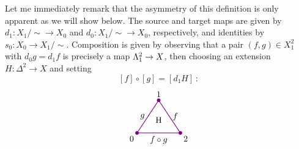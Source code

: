         Let me immediately remark that the asymmetry of this definition is only apparent as we will show below. The source and target maps are given by $d_1 \colon {X_1}/{\sim} \to X_0$ and $d_0 \colon {X_1}/{\sim} \to X_0$, respectively, and identities by $s_0 \colon X_0 \to {X_1}/{\sim}$. Composition is given by observing that a pair $(f, g) \in X^2_1$ with $d_0g = d_1f$ is precisely a map $\Lambda^{2}_{1} \to X$, then choosing an extension $H \colon \Delta^2 \to X$ and setting
        \begin{equation*}
            \left[f\right] \circ \left[g\right] = \left[d_1 H\right] \,\colon
        \end{equation*}
        \begin{equation*}
            \begin{tikzpicture}[
                scale=0.9, 
                thick, 
                color=violet, 
                every node/.style={text=black},
                dot/.style={circle, fill=violet, inner sep=1.5pt, outer sep=0pt}
            ]

                \coordinate (O) at (0,0);       %
                \coordinate (A) at (1, 1.5);    %
                \coordinate (B) at (2, 0);      %

                \draw (O) -- node[left] {$g$} (A) 
                    -- node[right] {$f$} (B) 
                    -- node[below] {$f \circ g$} cycle;

                \node[dot] at (O) {};
                \node[dot] at (A) {};
                \node[dot] at (B) {};

                \node[below left] at (O) {0};
                \node[above] at (A) {1};
                \node[below right] at (B) {2};

                \node[scale=1.0] at (1, 0.6) {H};

            \end{tikzpicture}
        \end{equation*}
        \smallskip


